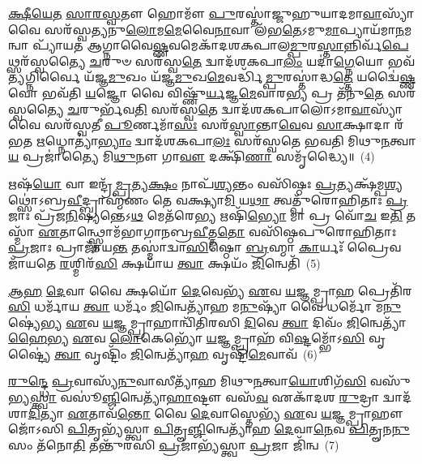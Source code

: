 \-\ul{𑌕𑍍𑌷𑍀}\-\-\ul{𑌯𑍇}\-\-\ul{𑌤} \ul{𑌸𑌾}\-\-\ul{𑌰}\-\-\ul{𑌸𑍍𑌵}\-𑌤𑍗 𑌹𑍋𑌮𑍗᳴ \ul{𑌪𑍁}\-𑌰𑌸𑍍𑌤𑌾॑𑌜𑍍𑌜𑍁𑌹𑍁𑌯𑌾𑌦𑌮𑌾\-\ul{𑌵𑌾}\-𑌸𑍍𑌯𑌾᳴ 𑌵𑍈 𑌸𑌰᳴𑌸𑍍𑌵𑌤𑍍𑌯𑌨𑍁\-\ul{𑌲𑍋}\-𑌮\-\ul{𑌮𑍇}\-𑌵𑍈\-\ul{𑌨𑌾}\-𑌵𑌾 𑌲᳴𑌭\-\ul{𑌤𑍇}\-\-𑌽𑌮𑍁\-\ul{𑌮𑌾}\-𑌪𑍍𑌯𑌾𑌯᳴𑌮𑌾\-\ul{𑌨}\-𑌮𑌨𑍍𑌵𑌾 𑌪𑍍𑌯𑌾᳴𑌯𑌤 𑌆𑌗𑍍𑌨𑌾𑌵𑍈\-\ul{𑌷𑍍𑌣}\-𑌵𑌮𑍇𑌕𑌾᳴\-𑌦𑌶\-𑌕𑌪𑌾𑌲\-\ul{𑌮𑍍𑌪𑍁}\-𑌰\-\ul{𑌸𑍍𑌤𑌾}\-𑌨𑍍𑌨𑌿𑌰𑍍𑌵᳴\-\ul{𑌪𑍇}\-𑌥𑍍𑌸𑌰᳴𑌸𑍍𑌵𑌤𑍍𑌯𑍈 \ul{𑌚}\-𑌰𑍁𑍞 𑌸𑌰᳴𑌸𑍍𑌵\-\ul{𑌤𑍇} 𑌦𑍍𑌵𑌾𑌦᳴𑌶\-𑌕𑌪𑌾\-\ul{𑌲𑌂} 𑌯𑌦𑌾॑\-\ul{𑌗𑍍𑌨𑍇}\-𑌯𑍋 𑌭𑌵᳴\-\ul{𑌤𑍍𑌯}\-𑌗𑍍𑌨𑌿𑌰𑍍𑌵𑍈 𑌯᳴𑌜𑍍𑌞\-\ul{𑌮𑍁}\-𑌖𑌂 𑌯᳴𑌜𑍍𑌞\-\ul{𑌮𑍁}\-𑌖\-\ul{𑌮𑍇}\-𑌵𑌰𑍍𑌦𑍍𑌧𑌿᳴\-\ul{𑌮𑍍𑌪𑍁}\-𑌰𑌸𑍍𑌤𑌾॑𑌦𑍍𑌧\-\ul{𑌤𑍍𑌤𑍇} 𑌯𑌦𑍍𑌵𑍈॑\-\ul{𑌷𑍍𑌣}\-𑌵𑍋 𑌭𑌵᳴𑌤𑌿 \ul{𑌯}\-𑌜𑍍𑌞𑍋 𑌵𑍈 𑌵𑌿𑌷𑍍𑌣𑍁᳴\-\ul{𑌰𑍍𑌯}\-𑌜𑍍𑌞\-\ul{𑌮𑍇}\-𑌵𑌾𑌰\-\ul{𑌭𑍍𑌯} 𑌪𑍍𑌰 𑌤᳴𑌨𑍁\-\ul{𑌤𑍇} 𑌸𑌰᳴𑌸𑍍𑌵𑌤𑍍𑌯𑍈 \ul{𑌚}\-𑌰𑍁𑌰𑍍𑌭᳴𑌵\-\ul{𑌤𑌿} 𑌸𑌰᳴𑌸𑍍𑌵\-\ul{𑌤𑍇} 𑌦𑍍𑌵𑌾𑌦᳴𑌶\-𑌕𑌪𑌾𑌲𑍋\-𑌽𑌮𑌾\-\ul{𑌵𑌾}\-𑌸𑍍𑌯𑌾᳴ 𑌵𑍈 𑌸𑌰᳴𑌸𑍍𑌵𑌤𑍀 \ul{𑌪𑍂}\-𑌰𑍍𑌣𑌮𑌾᳴\-\ul{𑌸𑌃} 𑌸𑌰᳴\-\ul{𑌸𑍍𑌵𑌾}\-𑌨𑍍𑌤𑌾\-\ul{𑌵𑍇}\-𑌵 \ul{𑌸𑌾}\-𑌕𑍍𑌷𑌾𑌦𑌾 𑌰᳴𑌭𑌤 \ul{𑌋}\-𑌧𑍍𑌨𑍋𑌤𑍍𑌯𑌾॑\-\ul{𑌭𑍍𑌯𑌾𑌂} 𑌦𑍍𑌵𑌾𑌦᳴𑌶\-𑌕𑌪𑌾\-\ul{𑌲𑌃} 𑌸𑌰᳴𑌸𑍍𑌵𑌤𑍇 𑌭𑌵𑌤𑌿 𑌮𑌿𑌥𑍁\-\ul{𑌨}\-𑌤𑍍𑌵𑌾\-\ul{𑌯} 𑌪𑍍𑌰𑌜𑌾॑𑌤𑍍𑌯𑍈 𑌮𑌿\-\ul{𑌥𑍁}\-𑌨𑍗 𑌗𑌾\-\ul{𑌵𑍗} 𑌦𑌕𑍍𑌷𑌿᳴\-\ul{𑌣𑌾} 𑌸𑌮𑍃᳴𑌦𑍍𑌧𑍍𑌯𑍈॥~(4)

{}%

𑌋𑌷᳴\-\ul{𑌯𑍋} 𑌵𑌾 𑌇𑌨𑍍𑌦𑍍𑌰᳴\-\ul{𑌮𑍍𑌪𑍍𑌰}\-𑌤𑍍𑌯\-\ul{𑌕𑍍𑌷𑌂} 𑌨𑌾𑌪᳴\-\ul{𑌶𑍍𑌯}\-𑌨𑍍𑌤𑌂 𑌵𑌸𑌿᳴𑌷𑍍𑌠𑌃 \ul{𑌪𑍍𑌰}\-𑌤𑍍𑌯𑌕𑍍𑌷᳴𑌮𑍍𑌪\-\ul{𑌶𑍍𑌯}\-𑌥𑍍𑌸𑍋॑\-𑌽𑌬𑍍𑌰\-\ul{𑌵𑍀}\-𑌦𑍍𑌬𑍍𑌰𑌾𑌹𑍍𑌮᳴𑌣𑌂 𑌤𑍇 𑌵𑌕𑍍𑌷𑍍𑌯𑌾\-\ul{𑌮𑌿} 𑌯\-\ul{𑌥𑌾} 𑌤𑍍𑌵𑌤𑍍𑌪𑍁᳴𑌰𑍋𑌹𑌿𑌤𑌾𑌃 \ul{𑌪𑍍𑌰}\-𑌜𑌾𑌃 𑌪𑍍𑌰᳴𑌜\-\ul{𑌨𑌿}\-𑌷𑍍𑌯𑌨𑍍𑌤𑍇\-𑌽\-\ul{𑌥} 𑌮𑍇𑌤᳴𑌰𑍇\-\ul{𑌭𑍍𑌯} 𑌋𑌷𑌿᳴\-\ul{𑌭𑍍𑌯𑍋} 𑌮𑌾 𑌪𑍍𑌰 𑌵𑍋᳴\-\ul{𑌚} 𑌇\-\ul{𑌤𑌿} 𑌤𑌸𑍍𑌮𑌾᳴ \ul{𑌏}\-𑌤𑌾𑌨𑍍𑌥𑍍𑌸𑍍𑌤𑍋𑌮᳴𑌭𑌾𑌗𑌾𑌨𑌬𑍍𑌰\-\ul{𑌵𑍀}\-𑌤𑍍𑌤\-\ul{𑌤𑍋} 𑌵𑌸𑌿᳴𑌷𑍍𑌠𑌪𑍁𑌰𑍋𑌹𑌿𑌤𑌾𑌃 \ul{𑌪𑍍𑌰}\-𑌜𑌾𑌃 𑌪𑍍𑌰𑌾𑌜𑌾᳴𑌯\-\ul{𑌨𑍍𑌤} 𑌤𑌸𑍍𑌮𑌾॑𑌦𑍍𑌵𑌾\-\ul{𑌸𑌿}\-𑌷𑍍𑌠𑍋 \ul{𑌬𑍍𑌰}\-𑌹𑍍𑌮𑌾 \ul{𑌕𑌾}\-𑌰𑍍𑌯𑌃᳴ 𑌪𑍍𑌰𑍈𑌵 𑌜𑌾᳴𑌯𑌤𑍇 \ul{𑌰}\-𑌶𑍍𑌮𑌿𑌰᳴\-\ul{𑌸𑌿} 𑌕𑍍𑌷𑌯𑌾᳴𑌯 \ul{𑌤𑍍𑌵𑌾} 𑌕𑍍𑌷𑌯𑌂᳴ \ul{𑌜𑌿}\-𑌨𑍍𑌵𑍇𑌤𑌿᳴~(5)

\-\ul{𑌆}\-\-\ul{𑌹} \ul{𑌦𑍇}\-𑌵𑌾 𑌵𑍈 𑌕𑍍𑌷𑌯𑍋᳴ \ul{𑌦𑍇}\-𑌵𑍇𑌭𑍍𑌯᳴ \ul{𑌏}\-𑌵 \ul{𑌯}\-𑌜𑍍𑌞𑌮𑍍𑌪𑍍𑌰𑌾\-\ul{𑌹} 𑌪𑍍𑌰𑍇𑌤𑌿᳴𑌰\-\ul{𑌸𑌿} 𑌧𑌰𑍍𑌮𑌾᳴𑌯 \ul{𑌤𑍍𑌵𑌾} 𑌧𑌰𑍍𑌮𑌂᳴ \ul{𑌜𑌿}\-𑌨𑍍𑌵𑍇𑌤𑍍𑌯𑌾᳴𑌹 𑌮\-\ul{𑌨𑍁}\-𑌷𑍍𑌯𑌾᳴ 𑌵𑍈 𑌧𑌰𑍍𑌮𑍋᳴ 𑌮\-\ul{𑌨𑍁}\-𑌷𑍍𑌯𑍇॑𑌭𑍍𑌯 \ul{𑌏}\-𑌵 \ul{𑌯}\-𑌜𑍍𑌞𑌮𑍍𑌪𑍍𑌰𑌾𑌹𑌾𑌨𑍍𑌵𑌿᳴𑌤𑌿𑌰𑌸𑌿 \ul{𑌦𑌿}\-𑌵𑍇 \ul{𑌤𑍍𑌵𑌾} 𑌦𑌿𑌵𑌂᳴ \ul{𑌜𑌿}\-𑌨𑍍𑌵𑍇𑌤𑍍𑌯𑌾᳴\-\ul{𑌹𑍈}\-𑌭𑍍𑌯 \ul{𑌏}\-𑌵 \ul{𑌲𑍋}\-𑌕𑍇𑌭𑍍𑌯𑍋᳴ \ul{𑌯}\-𑌜𑍍𑌞𑌮𑍍𑌪𑍍𑌰𑌾𑌹᳴ 𑌵𑌿\-\ul{𑌷𑍍𑌟}\-𑌮𑍍𑌭𑍋᳴\-𑌽\-\ul{𑌸𑌿} 𑌵𑍃𑌷𑍍𑌟𑍍𑌯𑍈॑ \ul{𑌤𑍍𑌵𑌾} 𑌵𑍃𑌷𑍍𑌟𑌿𑌂᳴ \ul{𑌜𑌿}\-𑌨𑍍𑌵𑍇𑌤𑍍𑌯𑌾᳴\-\ul{𑌹} 𑌵𑍃𑌷𑍍𑌟𑌿᳴\-\ul{𑌮𑍇}\-𑌵𑌾𑌵᳴~(6)

\-\ul{𑌰𑍁}\-\-\ul{𑌨𑍍𑌦𑍍𑌧𑍇} \ul{𑌪𑍍𑌰}\-𑌵𑌾𑌸𑍍𑌯᳴\-\ul{𑌨𑍁}\-𑌵𑌾𑌸𑍀𑌤𑍍𑌯𑌾᳴𑌹 𑌮𑌿𑌥𑍁\-\ul{𑌨}\-𑌤𑍍𑌵𑌾\-\ul{𑌯𑍋}\-𑌶𑌿𑌗᳴\-\ul{𑌸𑌿} 𑌵𑌸𑍁᳴𑌭𑍍𑌯\-\ul{𑌸𑍍𑌤𑍍𑌵𑌾} 𑌵𑌸𑍂॑\-\ul{𑌞𑍍𑌜𑌿}\-𑌨𑍍𑌵𑍇𑌤𑍍𑌯𑌾᳴\-\ul{𑌹𑌾}\-𑌷𑍍𑌟𑍗 𑌵𑌸᳴\-\ul{𑌵} 𑌏𑌕𑌾᳴\-𑌦𑌶 \ul{𑌰𑍁}\-𑌦𑍍𑌰𑌾 𑌦𑍍𑌵𑌾𑌦᳴𑌶𑌾\-\ul{𑌦𑌿}\-𑌤𑍍𑌯𑌾 \ul{𑌏}\-𑌤𑌾𑌵᳴\-\ul{𑌨𑍍𑌤𑍋} 𑌵𑍈 \ul{𑌦𑍇}\-𑌵𑌾𑌸𑍍𑌤𑍇𑌭𑍍𑌯᳴ \ul{𑌏}\-𑌵 \ul{𑌯}\-𑌜𑍍𑌞𑌮𑍍𑌪𑍍𑌰𑌾𑌹𑍗𑌜𑍋᳴\-𑌽𑌸𑌿 \ul{𑌪𑌿}\-𑌤𑍃𑌭𑍍𑌯᳴𑌸𑍍𑌤𑍍𑌵𑌾 \ul{𑌪𑌿}\-𑌤𑍄\-\ul{𑌞𑍍𑌜𑌿}\-𑌨𑍍𑌵𑍇𑌤𑍍𑌯𑌾᳴𑌹 \ul{𑌦𑍇}\-𑌵𑌾\-\ul{𑌨𑍇}\-𑌵 \ul{𑌪𑌿}\-𑌤𑍄𑌨\-\ul{𑌨𑍁} 𑌸𑌂 𑌤᳴𑌨𑍋\-\ul{𑌤𑌿} 𑌤𑌨𑍍𑌤𑍁᳴𑌰𑌸𑌿 \ul{𑌪𑍍𑌰}\-𑌜𑌾𑌭𑍍𑌯᳴𑌸𑍍𑌤𑍍𑌵𑌾 \ul{𑌪𑍍𑌰}\-𑌜𑌾 𑌜𑌿᳴𑌨𑍍𑌵~(7)

